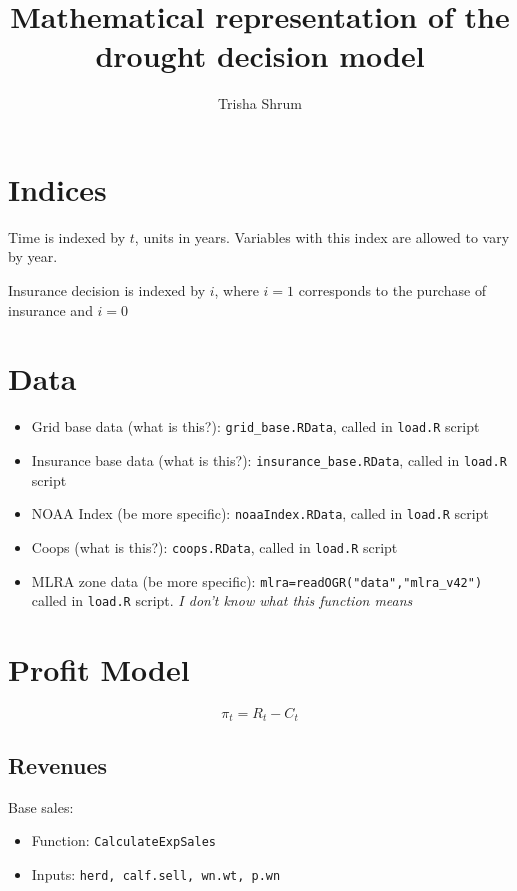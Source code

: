 \documentclass[11pt]{article}
\title{Mathematical representation of the drought decision model}
\author{Trisha Shrum}
\begin{document}
\maketitle


\section{Indices}
Time is indexed by $t$, units in years. Variables with this index are allowed to vary by year.

Insurance decision is indexed by $i$, where $i=1$ corresponds to the purchase of insurance and $i=0$

\section{Data}
\begin{itemize}
\item Grid base data (what is this?): \verb!grid_base.RData!, called in \verb!load.R! script
\item Insurance base data (what is this?): \verb!insurance_base.RData!, called in \verb!load.R! script
\item NOAA Index (be more specific): \verb!noaaIndex.RData!, called in \verb!load.R! script
\item Coops (what is this?): \verb!coops.RData!, called in \verb!load.R! script
\item MLRA zone data (be more specific): \verb!mlra=readOGR("data","mlra_v42")!  called in \verb!load.R! script. \textit{I don't know what this function means}
\end{itemize}

\section{Profit Model}
\begin{equation}
\pi_t = R_t - C_t
\end{equation}

\subsection{Revenues}
Base sales: 
\begin{itemize}
\item Function: \verb!CalculateExpSales! 
\item Inputs: \verb!herd, calf.sell, wn.wt, p.wn!
\end{itemize}
\end{document}
